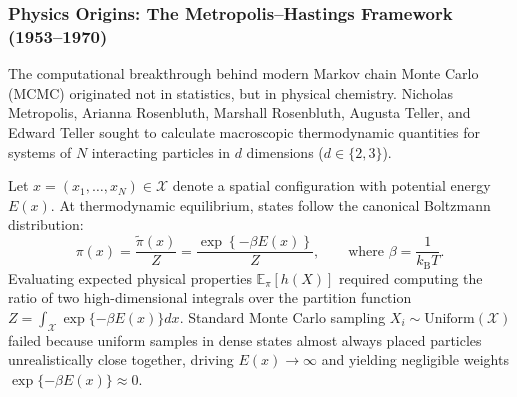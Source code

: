 \noindent
{}

\subsubsection{Physics Origins: The Metropolis--Hastings Framework (1953--1970)}
\label{subsec:metropolis-hastings}

The computational breakthrough behind modern Markov chain Monte Carlo (MCMC) originated not in statistics, but in physical chemistry. Nicholas Metropolis, Arianna Rosenbluth, Marshall Rosenbluth, Augusta Teller, and Edward Teller \cite{metropolis1953} sought to calculate macroscopic thermodynamic quantities for systems of $N$ interacting particles in $d$ dimensions ($d \in \{2, 3\}$).

Let $x = (x_1, \dots, x_N) \in \mathcal{X}$ denote a spatial configuration with potential energy $E(x)$. At thermodynamic equilibrium, states follow the canonical Boltzmann distribution:
\begin{equation}
    \pi(x) = \frac{\widetilde{\pi}(x)}{Z} = \frac{\exp\left\{-\beta E(x)\right\}}{Z}, \qquad \text{where } \beta = \frac{1}{k_{\mathrm{B}}T}.
\end{equation}
Evaluating expected physical properties $\mathbb{E}_{\pi}[h(X)]$ required computing the ratio of two high-dimensional integrals over the partition function $Z = \int_{\mathcal{X}} \exp\{-\beta E(x)\} dx$. Standard Monte Carlo sampling $X_i \sim \text{Uniform}(\mathcal{X})$ failed because uniform samples in dense states almost always placed particles unrealistically close together, driving $E(x) \to \infty$ and yielding negligible weights $\exp\{-\beta E(x)\} \approx 0$.


